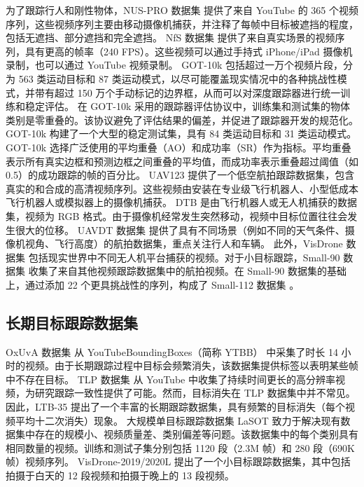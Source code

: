 为了跟踪行人和刚性物体，NUS-PRO 数据集 \cite{NUS} 提供了来自 YouTube 的 365 个视频序列，这些视频序列主要由移动摄像机捕获，并注释了每帧中目标被遮挡的程度，包括无遮挡、部分遮挡和完全遮挡。
NfS 数据集 \cite{Nfs} 提供了来自真实场景的视频序列，具有更高的帧率（240 FPS）。这些视频可以通过手持式 iPhone/iPad 摄像机录制，也可以通过 YouTube 视频录制。
GOT-10k \cite{GOT-10k} 包括超过一万个视频片段，分为 563 类运动目标和 87 类运动模式，以尽可能覆盖现实情况中的各种挑战性模式，并带有超过 150 万个手动标记的边界框，从而可以对深度跟踪器进行统一训练和稳定评估。
在 GOT-10k 采用的跟踪器评估协议中，训练集和测试集的物体类别是零重叠的。该协议避免了评估结果的偏差，并促进了跟踪器开发的规范化。
GOT-10k 构建了一个大型的稳定测试集，具有 84 类运动目标和 31 类运动模式。GOT-10k 选择广泛使用的平均重叠（AO）和成功率（SR）作为指标。平均重叠表示所有真实边框和预测边框之间重叠的平均值，而成功率表示重叠超过阈值（如 0.5）的成功跟踪的帧的百分比。
UAV123 \cite{mueller2016benchmark} 提供了一个低空航拍跟踪数据集，包含真实的和合成的高清视频序列。这些视频由安装在专业级飞行机器人、小型低成本飞行机器人或模拟器上的摄像机捕获。
DTB \cite{DTB} 是由飞行机器人或无人机捕获的数据集，视频为 RGB 格式。由于摄像机经常发生突然移动，视频中目标位置往往会发生很大的位移。
UAVDT 数据集 \cite{UAVDT} 提供了具有不同场景（例如不同的天气条件、摄像机视角、飞行高度）的航拍数据集，重点关注行人和车辆。
此外，VisDrone 数据集 \cite{VisDrone} 包括现实世界中不同无人机平台捕获的视频。对于小目标跟踪，Small-90 数据集 \cite{Small} 收集了来自其他视频跟踪数据集中的航拍视频。在 Small-90 数据集的基础上，通过添加 22 个更具挑战性的序列，构成了 Small-112 数据集 \cite{Small}。 
\subsection{长期目标跟踪数据集}
OxUvA 数据集 \cite{OxUvA} 从 YouTubeBoundingBoxes（简称 YTBB）\cite{YTBB} 中采集了时长 14 小时的视频。由于长期跟踪过程中目标会频繁消失，该数据集提供标签以表明某些帧中不存在目标。
TLP 数据集 \cite{TLP} 从 YouTube 中收集了持续时间更长的高分辨率视频，为研究跟踪一致性提供了可能。然而，目标消失在 TLP 数据集中并不常见。
因此，LTB-35 \cite{LTB} 提出了一个丰富的长期跟踪数据集，具有频繁的目标消失（每个视频平均十二次消失）现象。
大规模单目标跟踪数据集 LaSOT \cite{LaSOT} 致力于解决现有数据集中存在的规模小、视频质量差、类别偏差等问题。该数据集中的每个类别具有相同数量的视频。训练和测试子集分别包括 1120 段（2.3M 帧）和 280 段（690K 帧）视频序列。
VisDrone-2019/2020L \cite{VisDrone} 提出了一个小目标跟踪数据集，其中包括拍摄于白天的 12 段视频和拍摄于晚上的 13 段视频。%

